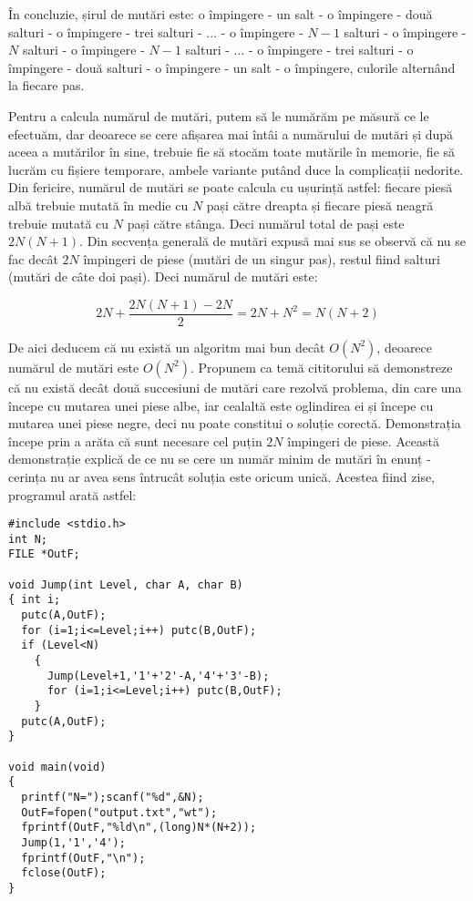 În concluzie, șirul de mutări este: o împingere - un salt - o împingere - două
salturi - o împingere - trei salturi - ... - o împingere - $N-1$ salturi - o
împingere - $N$ salturi - o împingere - $N-1$ salturi - ... - o împingere -
trei salturi - o împingere - două salturi - o împingere - un salt - o
împingere, culorile alternând la fiecare pas.

Pentru a calcula numărul de mutări, putem să le numărăm pe măsură ce le
efectuăm, dar deoarece se cere afișarea mai întâi a numărului de mutări și
după aceea a mutărilor în sine, trebuie fie să stocăm toate mutările în
memorie, fie să lucrăm cu fișiere temporare, ambele variante putând duce la
complicații nedorite. Din fericire, numărul de mutări se poate calcula cu
ușurință astfel: fiecare piesă albă trebuie mutată în medie cu $N$ pași către
dreapta și fiecare piesă neagră trebuie mutată cu $N$ pași către stânga. Deci
numărul total de pași este $2N(N+1).$ Din secvența generală de mutări expusă
mai sus se observă că nu se fac decât $2N$ împingeri de piese (mutări de un
singur pas), restul fiind salturi (mutări de câte doi pași). Deci numărul de
mutări este:

\begin{equation}
  2N + \frac{2N(N + 1) - 2N}{2} = 2N + N^2 = N(N + 2)
\end{equation}

De aici deducem că nu există un algoritm mai bun decât $O(N^2)$, deoarece
numărul de mutări este $O(N^2)$. Propunem ca temă cititorului să demonstreze
că nu există decât două succesiuni de mutări care rezolvă problema, din care
una începe cu mutarea unei piese albe, iar cealaltă este oglindirea ei și
începe cu mutarea unei piese negre, deci nu poate constitui o soluție
corectă. Demonstrația începe prin a arăta că sunt necesare cel puțin $2N$
împingeri de piese. Această demonstrație explică de ce nu se cere un număr
minim de mutări în enunț - cerința nu ar avea sens întrucât soluția este
oricum unică.  Acestea fiind zise, programul arată astfel:

\begin{verbatim}
#include <stdio.h>
int N;
FILE *OutF;

void Jump(int Level, char A, char B)
{ int i;
  putc(A,OutF);
  for (i=1;i<=Level;i++) putc(B,OutF);
  if (Level<N)
    {
      Jump(Level+1,'1'+'2'-A,'4'+'3'-B);
      for (i=1;i<=Level;i++) putc(B,OutF);
    }
  putc(A,OutF);
}

void main(void)
{
  printf("N=");scanf("%d",&N);
  OutF=fopen("output.txt","wt");
  fprintf(OutF,"%ld\n",(long)N*(N+2));
  Jump(1,'1','4');
  fprintf(OutF,"\n");
  fclose(OutF);
}
\end{verbatim}
